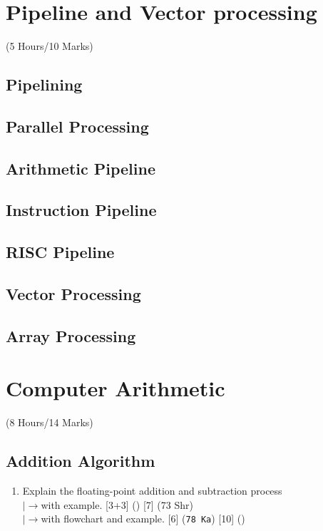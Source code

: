 \documentclass[12pt]{article}
\newcommand{\lb}{\\$\left|\rightarrow\right.$}
\begin{document}
	\pagebreak
\section{Pipeline and Vector processing}
	\begin{center}(5 Hours/10 Marks)\end{center}
	\subsection{Pipelining}
	\subsection{Parallel Processing}
	\subsection{Arithmetic Pipeline}
	\subsection{Instruction Pipeline}
	\subsection{RISC Pipeline}
	\subsection{Vector Processing}
	\subsection{Array Processing}

	\pagebreak
\section{Computer Arithmetic}
	\begin{center}(8 Hours/14 Marks)\end{center}
	\subsection{Addition Algorithm}
	\begin{enumerate}[noitemsep, topsep=0pt]
		\item Explain the floating-point addition and subtraction process
		\lb with example. \hfill [3+3] () [7] (73 Shr)
		\lb with flowchart and example. \hfill [6] (\texttt{78 Ka}) [10] ()
	\end{enumerate}
\end{document}
